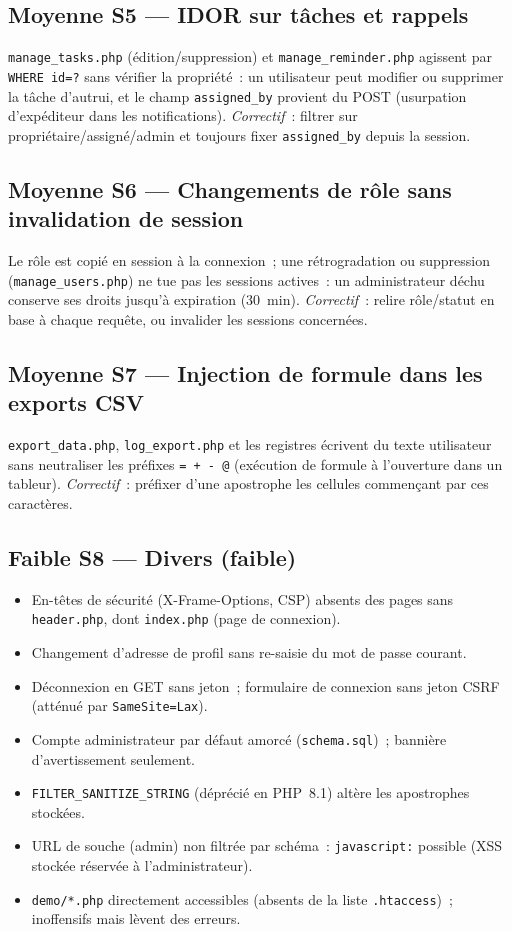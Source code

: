 \documentclass[11pt,a4paper]{article}
\newcommand{\sev}[2]{\textcolor{#1}{\textbf{#2}}}
\newcommand{\med}{\sev{med}{Moyenne}}
\newcommand{\low}{\sev{low}{Faible}}
\begin{document}
\subsection*{\med{} S5 --- IDOR sur tâches et rappels}
\texttt{manage\_tasks.php} (édition/suppression) et
\texttt{manage\_reminder.php} agissent par \texttt{WHERE id=?} sans vérifier la
propriété~: un utilisateur peut modifier ou supprimer la tâche d'autrui, et le
champ \texttt{assigned\_by} provient du POST (usurpation d'expéditeur dans les
notifications). \emph{Correctif}~: filtrer sur propriétaire/assigné/admin et
toujours fixer \texttt{assigned\_by} depuis la session.

\subsection*{\med{} S6 --- Changements de rôle sans invalidation de session}
Le rôle est copié en session à la connexion~; une rétrogradation ou
suppression (\texttt{manage\_users.php}) ne tue pas les sessions actives~: un
administrateur déchu conserve ses droits jusqu'à expiration (30~min).
\emph{Correctif}~: relire rôle/statut en base à chaque requête, ou invalider
les sessions concernées.

\subsection*{\med{} S7 --- Injection de formule dans les exports CSV}
\texttt{export\_data.php}, \texttt{log\_export.php} et les registres écrivent
du texte utilisateur sans neutraliser les préfixes \texttt{= + - @}
(exécution de formule à l'ouverture dans un tableur).
\emph{Correctif}~: préfixer d'une apostrophe les cellules commençant par ces
caractères.

\subsection*{\low{} S8 --- Divers (faible)}
\begin{itemize}[nosep,leftmargin=1.4em]
  \item En-têtes de sécurité (X-Frame-Options, CSP) absents des pages sans
    \texttt{header.php}, dont \texttt{index.php} (page de connexion).
  \item Changement d'adresse de profil sans re-saisie du mot de passe courant.
  \item Déconnexion en GET sans jeton~; formulaire de connexion sans jeton CSRF
    (atténué par \texttt{SameSite=Lax}).
  \item Compte administrateur par défaut amorcé (\texttt{schema.sql})~;
    bannière d'avertissement seulement.
  \item \texttt{FILTER\_SANITIZE\_STRING} (déprécié en PHP~8.1) altère les
    apostrophes stockées.
  \item URL de souche (admin) non filtrée par schéma~: \texttt{javascript:}
    possible (XSS stockée réservée à l'administrateur).
  \item \texttt{demo/*.php} directement accessibles (absents de la liste
    \texttt{.htaccess})~; inoffensifs mais lèvent des erreurs.
\end{itemize}
\end{document}
